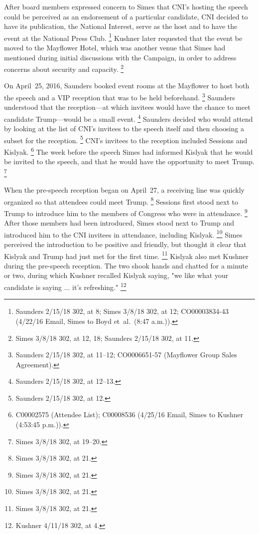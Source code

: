 After board members expressed concern to Simes that CNI's hosting the speech could be perceived as an endorsement of a particular candidate, CNI decided to have its publication, the National Interest, serve as the host and to have the event at the National Press Club.%
\footnote{Saunders 2/15/18 302, at 8;
Simes 3/8/18 302, at 12;
CO00003834-43 (4/22/16 Email, Simes to Boyd et~al.\ (8:47 a.m.)).}
Kushner later requested that the event be moved to the Mayflower Hotel, which was another venue that Simes had mentioned during initial discussions with the Campaign, in order to address concerns about security and capacity.%
\footnote{Simes 3/8/18 302, at 12, 18;
Saunders 2/15/18 302, at 11.}

On April~25, 2016, Saunders booked event rooms at the Mayflower to host both the speech and a VIP reception that was to be held beforehand.%
\footnote{Saunders 2/15/18 302, at 11--12;
CO0006651-57 (Mayflower Group Sales Agreement).}
Saunders understood that the reception---at which invitees would have the chance to meet candidate Trump---would be a small event.%
\footnote{Saunders 2/15/18 302, at 12--13.}
Saunders decided who would attend by looking at the list of CNI's invitees to the speech itself and then choosing a subset for the reception.%
\footnote{Saunders 2/15/18 302, at 12.}
CNI's invitees to the reception included Sessions and Kislyak.%
\footnote{C00002575 (Attendee List);
C00008536 (4/25/16 Email, Simes to Kushner (4:53:45 p.m.)).}
The week before the speech Simes had informed Kislyak that he would be invited to the speech, and that he would have the opportunity to meet Trump.%
\footnote{Simes 3/8/18 302, at 19--20.}

When the pre-speech reception began on April~27, a receiving line was quickly organized so that attendees could meet Trump.%
\footnote{Simes 3/8/18 302, at 21.}
Sessions first stood next to Trump to introduce him to the members of Congress who were in attendance.%
\footnote{Simes 3/8/18 302, at 21.}
After those members had been introduced, Simes stood next to Trump and introduced him to the CNI invitees in attendance, including Kislyak.%
\footnote{Simes 3/8/18 302, at 21.}
Simes perceived the introduction to be positive and friendly, but thought it clear that Kislyak and Trump had just met for the first time.%
\footnote{Simes 3/8/18 302, at 21.}
Kislyak also met Kushner during the pre-speech reception.
The two shook hands and chatted for a minute or two, during which Kushner recalled Kislyak saying, "we like what your candidate is saying ... it's refreshing."%
\footnote{Kushner 4/11/18 302, at 4.}

